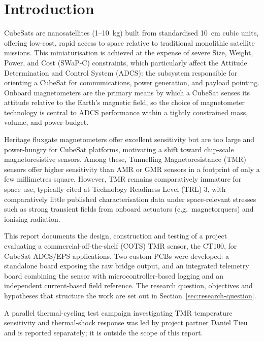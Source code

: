 \documentclass[12pt,a4paper]{article}
\begin{document}
\clearpage


\section{Introduction}
\label{sec:intro}

CubeSats are nanosatellites (1--10~kg) built from standardised 10~cm cubic units, offering low-cost, rapid access to space relative to traditional monolithic satellite missions. This miniaturisation is achieved at the expense of severe Size, Weight, Power, and Cost (SWaP-C) constraints, which particularly affect the Attitude Determination and Control System (ADCS): the subsystem responsible for orienting a CubeSat for communications, power generation, and payload pointing. Onboard magnetometers are the primary means by which a CubeSat senses its attitude relative to the Earth's magnetic field, so the choice of magnetometer technology is central to ADCS performance within a tightly constrained mass, volume, and power budget.

Heritage fluxgate magnetometers offer excellent sensitivity but are too large and power-hungry for CubeSat platforms, motivating a shift toward chip-scale magnetoresistive sensors. Among these, Tunnelling Magnetoresistance (TMR) sensors offer higher sensitivity than AMR or GMR sensors in a footprint of only a few millimetres square. However, TMR remains comparatively immature for space use, typically cited at Technology Readiness Level (TRL) 3, with comparatively little published characterisation data under space-relevant stresses such as strong transient fields from onboard actuators (e.g.\ magnetorquers) and ionising radiation.

This report documents the design, construction and testing of a project evaluating a commercial-off-the-shelf (COTS) TMR sensor, the CT100, for CubeSat ADCS/EPS applications. Two custom PCBs were developed: a standalone board exposing the raw bridge output, and an integrated telemetry board combining the sensor with microcontroller-based logging and an independent current-based field reference. The research question, objectives and hypotheses that structure the work are set out in Section~\ref{sec:research-question}.

A parallel thermal-cycling test campaign investigating TMR temperature sensitivity and thermal-shock response was led by project partner Daniel Tieu and is reported separately; it is outside the scope of this report.
\end{document}
